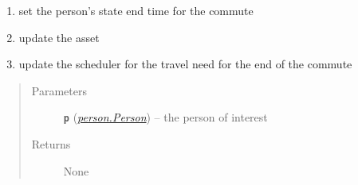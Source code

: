 \documentclass[letterpaper,10pt,english]{sphinxmanual}
\begin{document}
\begin{fulllineitems}
\begin{fulllineitems}
\begin{enumerate}
\item {} 
set the person's state end time for the commute

\item {} 
update the asset

\item {} 
update the scheduler for the travel need for the end of the commute

\end{enumerate}
\begin{quote}\begin{description}
\item[{Parameters}] \leavevmode
\textbf{\texttt{p}} ({\hyperref[person:person.Person]{\emph{\emph{person.Person}}}}) -- the person of interest

\item[{Returns}] \leavevmode
None

\end{description}\end{quote}

\end{fulllineitems}


\end{fulllineitems}

\end{document}

